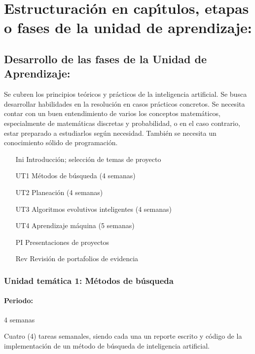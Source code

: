 \section{Estructuraci\'{o}n en cap\'{\i}tulos, etapas o fases de la unidad de
  aprendizaje:}

\subsection{Desarrollo de las fases de la Unidad de Aprendizaje:}

Se cubren los principios te\'{o}ricos y pr\'{a}cticos de la
inteligencia artificial. Se busca desarrollar habilidades en la
resoluci\'{o}n en casos pr\'{a}cticos concretos. Se necesita contar
con un buen entendimiento de varios los conceptos matem\'{a}ticos,
especialmente de matem\'{a}ticas discretas y probabilidad, o en el
caso contrario, estar preparado a estudiarlos seg\'{u}n
necesidad. Tambi\'{e}n se necesita un conocimiento s\'{o}lido de
programaci\'{o}n.



\begin{enumerate}[itemsep=-3pt]
\item[Ini]{Introducci\'{o}n; selecci\'{o}n de temas de proyecto}
\item[UT1]{M\'{e}todos de b\'{u}squeda (4 semanas)}
\item[UT2]{Planeaci\'{o}n (4 semanas)}
\item[UT3]{Algoritmos evolutivos inteligentes (4 semanas)}
\item[UT4]{Aprendizaje m\'{a}quina (5 semanas)}
\item[PI]{Presentaciones de proyectos}
\item[Rev]{Revisi\'{o}n de portafolios de evidencia}
\end{enumerate}

\subsubsection{Unidad tem\'{a}tica 1: M\'{e}todos de b\'{u}squeda}

\paragraph{Periodo:} 4 semanas



Cuatro (4) tareas semanales, siendo cada una un reporte escrito y
c\'{o}digo de la implementaci\'{o}n de un m\'{e}todo de b\'{u}squeda de
inteligencia artificial.

